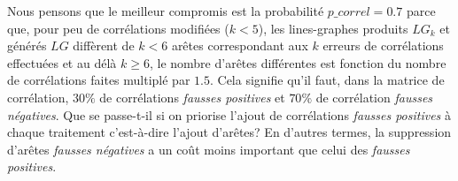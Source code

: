 Nous pensons que le meilleur compromis est la probabilit\'e $p\_correl = 0.7$ parce que, pour peu de corr\'elations modifi\'ees ($k<5$), les lines-graphes produits $LG_k$ et g\'en\'er\'es $LG$ diff\`erent de $k<6$ ar\^etes correspondant aux $k$ erreurs de  corr\'elations effectu\'ees  et au d\'el\`a $k \geq 6$, le nombre d'ar\^etes diff\'erentes est fonction du nombre de corr\'elations faites multipl\'e par $1.5$.
Cela signifie qu'il faut, dans la matrice de corr\'elation, $30\%$ de corr\'elations {\em fausses positives} et $70\%$ de corr\'elation {\em fausses n\'egatives}. 
\newline
Que se passe-t-il si on priorise l'ajout de corr\'elations {\em fausses positives} \`a chaque traitement c'est-\`a-dire l'ajout d'ar\^etes?  
En d'autres termes, la suppression d'ar\^etes {\em fausses n\'egatives} a un co\^ut moins important que celui des {\em fausses positives}. 
